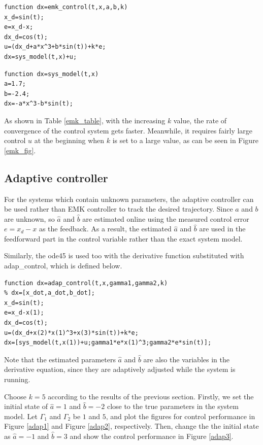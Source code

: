\documentclass[12pt,a4paper]{article}
\begin{document}
\begin{lstlisting}
function dx=emk_control(t,x,a,b,k)
x_d=sin(t);
e=x_d-x;
dx_d=cos(t);
u=(dx_d+a*x^3+b*sin(t))+k*e;
dx=sys_model(t,x)+u;
\end{lstlisting}

\begin{lstlisting}
function dx=sys_model(t,x)
a=1.7;
b=-2.4;
dx=-a*x^3-b*sin(t);
\end{lstlisting}

\indent As shown in Table \ref{emk_table}, with the increasing $k$ value, the rate of convergence of the control system gets faster. Meanwhile, it requires fairly large control $u$ at the beginning when $k$ is set to a large value, as can be seen in Figure \ref{emk_fig}.

\subsection{Adaptive controller}

\indent For the systems which contain unknown parameters, the adaptive controller can be used rather than EMK controller to track the desired trajectory. Since $a$ and $b$ are unknown, so $\hat{a}$ and $\hat{b}$ are estimated online using the measured control error $e=x_d-x$ as the feedback. As a result, the estimated $\hat{a}$ and $\hat{b}$ are used in the feedforward part in the control variable rather than the exact system model.

\indent Similarly, the ode45 is used too with the derivative function substituted with adap\_control, which is defined below.

\begin{lstlisting}
function dx=adap_control(t,x,gamma1,gamma2,k)
% dx=[x_dot,a_dot,b_dot];
x_d=sin(t);
e=x_d-x(1);
dx_d=cos(t);
u=(dx_d+x(2)*x(1)^3+x(3)*sin(t))+k*e;
dx=[sys_model(t,x(1))+u;gamma1*e*x(1)^3;gamma2*e*sin(t)];
\end{lstlisting}

Note that the estimated parameters $\hat{a}$ and $\hat{b}$ are also the variables in the derivative equation, since they are adaptively adjusted while the system is running.

\indent Choose $k=5$ according to the results of the previous section. Firstly, we set the initial state of $\hat{a}=1$ and $\hat{b}=-2$ close to the true parameters in the system model. Let $\Gamma_1$ and $\Gamma_2$ be $1$ and $5$, and plot the figures for control performance in Figure \ref{adap1} and Figure \ref{adap2}, respectively. Then, change the the initial state as $\hat{a}=-1$ and $\hat{b}=3$ and show the control performance in Figure \ref{adap3}.
\end{document}

